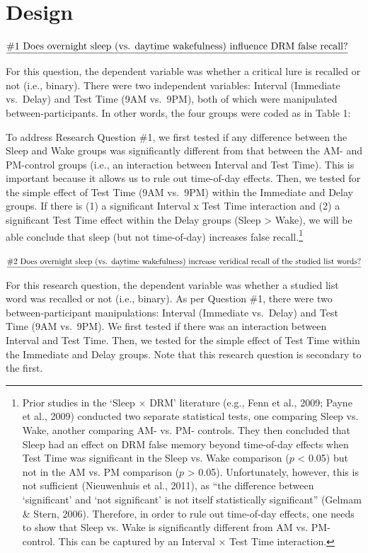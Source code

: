 \documentclass[
]{article}
\begin{document}
\hypertarget{design}{%
\section{Design}\label{design}}

\(\text{\underline{\#1 Does overnight sleep (vs. daytime wakefulness) influence DRM false recall?}}\)

For this question, the dependent variable was whether a critical lure is recalled or not (i.e., binary). There were two independent variables: Interval (Immediate vs.~Delay) and Test Time (9AM vs.~9PM), both of which were manipulated between-participants. In other words, the four groups were coded as in Table 1:

To address Research Question \#1, we first tested if any difference between the Sleep and Wake groups was significantly different from that between the AM- and PM-control groups (i.e., an interaction between Interval and Test Time). This is important because it allows us to rule out time-of-day effects. Then, we tested for the simple effect of Test Time (9AM vs.~9PM) within the Immediate and Delay groups. If there is (1) a significant Interval x Test Time interaction and (2) a significant Test Time effect within the Delay groups (Sleep \textgreater{} Wake), we will be able conclude that sleep (but not time-of-day) increases false recall.\footnote{Prior studies in the ‘Sleep $\times$ DRM’ literature (e.g., Fenn et al., 2009; Payne et al., 2009) conducted two separate statistical tests, one comparing Sleep vs. Wake, another comparing AM- vs. PM- controls. They then concluded that Sleep had an effect on DRM false memory beyond time-of-day effects when Test Time was significant in the Sleep vs. Wake comparison ($p$ < 0.05) but not in the AM vs. PM comparison ($p$ > 0.05). Unfortunately, however, this is not sufficient (Nieuwenhuis et al., 2011), as “the difference between ‘significant’ and ‘not significant’ is not itself statistically significant” (Gelmam \& Stern, 2006). Therefore, in order to rule out time-of-day effects, one needs to show that Sleep vs. Wake is significantly different from AM vs. PM-control. This can be captured by an Interval $\times$ Test Time interaction.}

\(\text{\underline{\#2 Does overnight sleep (vs. daytime wakefulness) increase veridical recall of the studied list words?}}\)

For this research question, the dependent variable was whether a studied list word was recalled or not (i.e., binary). As per Question \#1, there were two between-participant manipulations: Interval (Immediate vs.~Delay) and Test Time (9AM vs.~9PM). We first tested if there was an interaction between Interval and Test Time. Then, we tested for the simple effect of Test Time within the Immediate and Delay groups. Note that this research question is secondary to the first.
\end{document}
